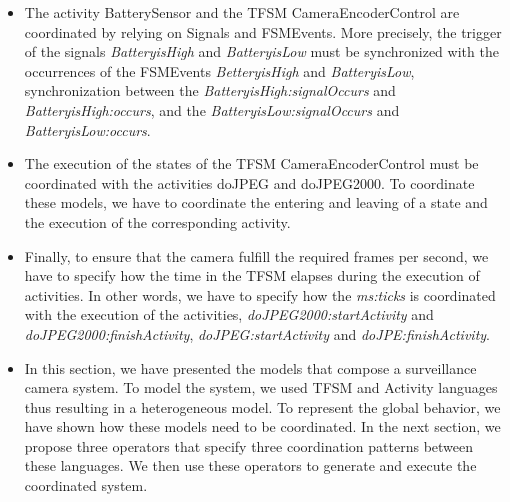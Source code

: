 \begin{itemize}
	
	\item The activity BatterySensor and the TFSM CameraEncoderControl are coordinated by relying on Signals and FSMEvents. More precisely, the trigger of the signals \emph{BatteryisHigh} and \emph{BatteryisLow} must be synchronized with the occurrences of the FSMEvents \emph{BetteryisHigh} and \emph{BatteryisLow}, \ie synchronization between the \mse \emph{BatteryisHigh:signalOccurs} and \emph{BatteryisHigh:occurs}, and the \mse \emph{BatteryisLow:signalOccurs} and \emph{BatteryisLow:occurs}.
	
	\item The execution of the states of the TFSM CameraEncoderControl must be coordinated with the activities doJPEG and doJPEG2000. To coordinate these models, we have to coordinate the entering and leaving of a state and the execution of the corresponding activity.
	
	\item Finally, to ensure that the camera fulfill the required frames per second, we have to specify how the time in the TFSM elapses during the execution of activities. In other words, we have to specify how the \mse \emph{ms:ticks} is coordinated with the execution of the activities, \eg \emph{doJPEG2000:startActivity} and \emph{doJPEG2000:finishActivity}, \emph{doJPEG:startActivity} and \emph{doJPE:finishActivity}.
	
	\item In this section, we have presented the models that compose a surveillance camera system. To model the system, we used TFSM and Activity languages thus resulting in a heterogeneous model. To represent the global behavior, we have shown how these models need to be coordinated. In the next section, we propose three \bcool operators that specify three coordination patterns between these languages. We then use these operators to generate and execute the coordinated system. 
	
	
	
\end{itemize}


